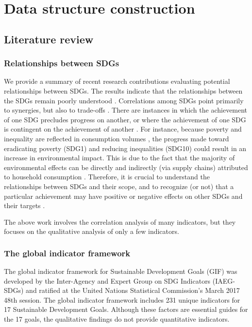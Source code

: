 \documentclass{mcmthesis}
\begin{document}
\section{ Data structure construction }
\subsection{ Literature review }
\subsubsection{ Relationships between SDGs }
We provide a summary of recent research contributions evaluating potential relationships between SDGs. The results indicate that the relationships between the SDGs remain poorly understood \cite{allen2018initial}. Correlations among SDGs point primarily to synergies, but also to trade-offs \cite{pradhan2017systematic}. There are instances in which the achievement of one SDG precludes progress on another, or where the achievement of one SDG is contingent on the achievement of another \cite{nilsson2016policy}. For instance, because poverty and inequality are reflected in consumption volumes \cite{aguiar2015has}, the progress made toward eradicating poverty (SDG1) and reducing inequalities (SDG10) could result in an increase in environmental impact. This is due to the fact that the majority of environmental effects can be directly and indirectly (via supply chains) attributed to household consumption \cite{ivanova2016environmental}. Therefore, it is crucial to understand the relationships between SDGs and their scope, and to recognize (or not) that a particular achievement may have positive or negative effects on other SDGs and their targets \cite{biggeri2019tracking}.

The above work involves the correlation analysis of many indicators, but they focuses on the qualitative analysis of only a few indicators.

\subsubsection{The global indicator framework}
The global indicator framework for Sustainable Development Goals (GIF) was developed by the Inter-Agency and Expert Group on SDG Indicators (IAEG-SDGs) and ratified at the United Nations Statistical Commission's March 2017 48th session. The global indicator framework includes 231 unique indicators for 17 Sustainable Development Goals. Although these factors are essential guides for the 17 goals, the qualitative findings do not provide quantitative indicators.
\end{document}
